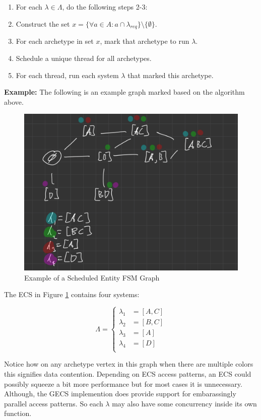 \begin{enumerate}
    \item For each $\lambda \in \Lambda$, do the following steps 2-3:
    \item Construct the set $x = \{\forall a \in A : a \cap \lambda_{req}\} \setminus \{\emptyset\}$.
    \item For each archetype in set $x$, mark that archetype to run $\lambda$.
    \item Schedule a unique thread for all archetypes.
    \item For each thread, run each system $\lambda$ that marked this archetype.
\end{enumerate}

\textbf{Example:} The following is an example graph marked based on the algorithm above.

\begin{figure}[H]
    \centering
    \includegraphics[width=0.5\linewidth]{resources/graph2.png}
    \caption{Example of a Scheduled Entity FSM Graph}
    \label{fig:graph2}
\end{figure}

The ECS in Figure \ref{fig:graph2} contains four systems: 

\begin{equation*}
    \Lambda = \begin{cases}
        \lambda_1 &= [A,C] \\
        \lambda_2 &= [B,C] \\ 
        \lambda_3 &= [A] \\ 
        \lambda_4 &= [D] \\ 
    \end{cases}
\end{equation*}

Notice how on any archetype vertex in this graph when there are multiple colors this signifies data contention. Depending on ECS access patterns, an ECS could possibly squeeze a bit more performance but for most cases it is unnecessary. Although, the GECS implemention does provide support for embarassingly parallel access patterns. So each $\lambda$ may also have some concurrency inside its own function.

